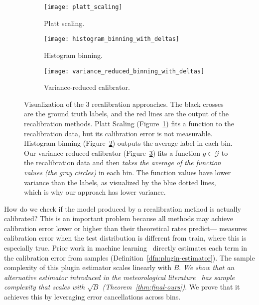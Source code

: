 \begin{figure}
     \centering
     \begin{subfigure}[b]{0.32\textwidth}
         \centering
         \texttt{[image: platt\_scaling]}
         \caption{Platt scaling.}
         \label{fig:platt_scaling}
     \end{subfigure}
     \hfill
     \begin{subfigure}[b]{0.32\textwidth}
         \centering
         \texttt{[image: histogram\_binning\_with\_deltas]}
         \caption{Histogram binning.}
         \label{fig:hist_binning}
     \end{subfigure}
     \hfill
     \begin{subfigure}[b]{0.32\textwidth}
         \centering
         \texttt{[image: variance\_reduced\_binning\_with\_deltas]}
         \caption{Variance-reduced calibrator.}
         \label{fig:var_red_binning}
     \end{subfigure}
        \caption{
        Visualization of the 3 recalibration approaches.
        The black crosses are the ground truth labels, and the red lines are the output of the recalibration methods.
        Platt Scaling (Figure~\ref{fig:platt_scaling}) fits a function to the recalibration data, but its calibration error is not measurable.
        Histogram binning (Figure~\ref{fig:hist_binning}) outputs the average label in each bin.
        Our variance-reduced calibrator (Figure~\ref{fig:var_red_binning}) fits a function $g \in \mathcal{G}$ to the recalibration data and then \emph{takes the average of the function values (the gray circles)} in each bin.
        The function values have lower variance than the labels, as visualized by the blue dotted lines, which is why our approach has lower variance. 
        }
        \label{fig:variance_reduced_illustration}
\end{figure}

How do we check if the model produced by a recalibration method is actually calibrated? This is an important problem because all methods may achieve calibration error lower or higher than their theoretical rates predict---\cite{hendrycks2019anomaly} measures calibration error when the test distribution is different from train, where this is especially true.  Prior work in machine learning~\cite{nguyen2015posterior, guo2017calibration, hendrycks2019anomaly, kuleshov2015calibrated, hendrycks2019pretraining} directly estimates each term in the calibration error from samples (Definition~\ref{dfn:plugin-estimator}).
The sample complexity of this plugin estimator scales linearly with $B$.
\emph{We show that an alternative estimator introduced in the meteorological literature~\cite{brocker2012empirical, ferro2012bias} has sample complexity that scales with $\sqrt{B}$ (Theorem~\ref{thm:final-ours})}.
We prove that it achieves this by leveraging error cancellations across bins.

